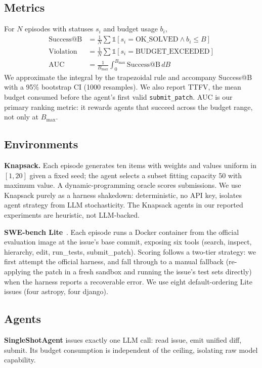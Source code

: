 \documentclass[journal=jacsat,manuscript=article]{achemso}
\begin{document}
\subsection{Metrics}
For $N$ episodes with statuses $s_i$ and budget usage $b_i$,
\begin{align*}
\text{Success@B} &= \tfrac{1}{N}\sum \mathbb{1}[s_i=\text{OK\_SOLVED} \land b_i\le B] \\
\text{Violation} &= \tfrac{1}{N}\sum \mathbb{1}[s_i=\text{BUDGET\_EXCEEDED}] \\
\text{AUC}       &= \tfrac{1}{B_\text{max}} \int_0^{B_\text{max}} \text{Success@B}\, dB
\end{align*}
We approximate the integral by the trapezoidal rule and accompany
Success@B with a 95\% bootstrap CI (1000 resamples). We also report
TTFV, the mean budget consumed before the agent's first valid
\texttt{submit\_patch}. AUC is our primary ranking metric: it rewards
agents that succeed across the budget range, not only at $B_\text{max}$.

\subsection{Environments}
\textbf{Knapsack.} Each episode generates ten items with weights and
values uniform in $[1,20]$ given a fixed seed; the agent selects a
subset fitting capacity 50 with maximum value. A
dynamic-programming oracle scores submissions. We use Knapsack
purely as a harness shakedown: deterministic, no API key, isolates
agent strategy from LLM stochasticity. The Knapsack agents in our
reported experiments are heuristic, not LLM-backed.

\textbf{SWE-bench Lite}~\cite{swebenchlite2024}. Each episode runs a
Docker container from the official evaluation image at the issue's
base commit, exposing six tools (search, inspect, hierarchy, edit,
run\_tests, submit\_patch). Scoring follows a two-tier strategy: we
first attempt the official harness, and fall through to a manual
fallback (re-applying the patch in a fresh sandbox and running the
issue's test sets directly) when the harness reports a recoverable
error. We use eight
default-ordering Lite issues (four astropy, four django).

\subsection{Agents}
\textbf{SingleShotAgent} issues exactly one LLM call: read issue,
emit unified diff, submit. Its budget consumption is independent of
the ceiling, isolating raw model capability.
\end{document}
